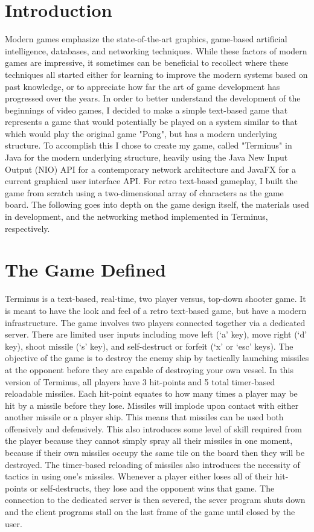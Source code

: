 \documentclass[12pt]{article}
\begin{document}
\section{Introduction}
    Modern games emphasize the state-of-the-art graphics, game-based artificial intelligence, databases, and networking techniques. While these factors of modern games are impressive, it sometimes can be beneficial to recollect where these techniques all started either for learning to improve the modern systems based on past knowledge, or to appreciate how far the art of game development has progressed over the years. In order to better understand the development of the beginnings of video games, I decided to make a simple text-based game that represents a game that would potentially be played on a system similar to that which would play the original game "Pong", but has a modern underlying structure. To accomplish this I chose to create my game, called "Terminus" in Java for the modern underlying structure, heavily using the Java New Input Output (NIO) API for a contemporary network architecture and JavaFX for a current graphical user interface API. For retro text-based gameplay, I built the game from scratch using a two-dimensional array of characters as the game board. The following goes into depth on the game design itself, the materials used in development, and the networking method implemented in Terminus, respectively.
    
\section{The Game Defined}
    Terminus is a text-based, real-time, two player versus, top-down shooter game. It is meant to have the look and feel of a retro text-based game, but have a modern infrastructure. The game involves two players connected together via a dedicated server. There are limited user inputs including move left (`a' key), move right (`d' key), shoot missile (`s' key), and self-destruct or forfeit (`x' or `esc' keys). The objective of the game is to destroy the enemy ship by tactically launching missiles at the opponent before they are capable of destroying your own vessel. In this version of Terminus, all players have 3 hit-points and 5 total timer-based reloadable missiles. Each hit-point equates to how many times a player may be hit by a missile before they lose. Missiles will implode upon contact with either another missile or a player ship. This means that missiles can be used both offensively and defensively. This also introduces some level of skill required from the player because they cannot simply spray all their missiles in one moment, because if their own missiles occupy the same tile on the board then they will be destroyed. The timer-based reloading of missiles also introduces the necessity of tactics in using one's missiles. Whenever a player either loses all of their hit-points or self-destructs, they lose and the opponent wins that game. The connection to the dedicated server is then severed, the sever program shuts down and the client programs stall on the last frame of the game until closed by the user.
    
\end{document}
